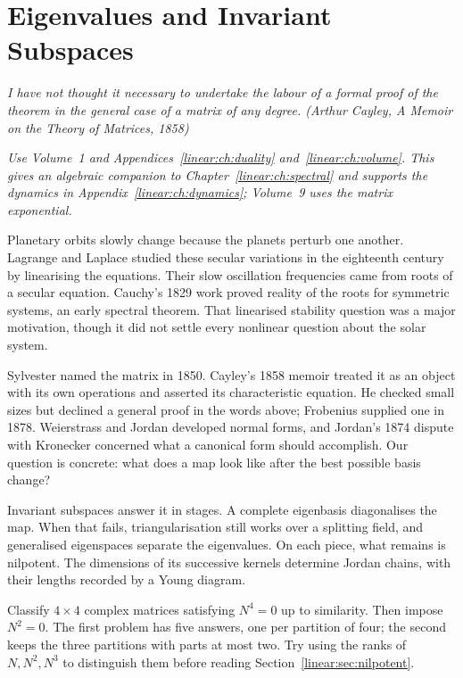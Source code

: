 \chapter{Eigenvalues and Invariant Subspaces}\label{linear:ch:eigen}

\begin{center}\itshape
I have not thought it necessary to undertake the labour of a formal proof of the theorem in the general case of a
matrix of any degree.
\upshape(Arthur Cayley, \emph{A Memoir on the Theory of Matrices}, 1858)
\end{center}
\noindent\emph{Use Volume~1 and Appendices~\ref{linear:ch:duality} and~\ref{linear:ch:volume}. This gives an algebraic companion to Chapter~\ref{linear:ch:spectral} and supports the dynamics in Appendix~\ref{linear:ch:dynamics}; Volume~9 uses the matrix exponential.}

Planetary orbits slowly change because the planets perturb one another. Lagrange and Laplace studied these secular variations in the eighteenth century by linearising the equations. Their slow oscillation frequencies came from roots of a secular equation. Cauchy's 1829 work proved reality of the roots for symmetric systems, an early spectral theorem. That linearised stability question was a major motivation, though it did not settle every nonlinear question about the solar system.

Sylvester named the matrix in 1850. Cayley's 1858 memoir treated it as an object with its own operations and asserted its characteristic equation. He checked small sizes but declined a general proof in the words above; Frobenius supplied one in 1878. Weierstrass and Jordan developed normal forms, and Jordan's 1874 dispute with Kronecker concerned what a canonical form should accomplish. Our question is concrete: what does a map look like after the best possible basis change?

Invariant subspaces answer it in stages. A complete eigenbasis diagonalises the map. When that fails, triangularisation still works over a splitting field, and generalised eigenspaces separate the eigenvalues. On each piece, what remains is nilpotent. The dimensions of its successive kernels determine Jordan chains, with their lengths recorded by a Young diagram.

\begin{think}
Classify $4\times4$ complex matrices satisfying $N^4=0$ up to similarity. Then impose $N^2=0$. The first problem has five answers, one per partition of four; the second keeps the three partitions with parts at most two. Try using the ranks of $N,N^2,N^3$ to distinguish them before reading Section~\ref{linear:sec:nilpotent}.
\end{think}

